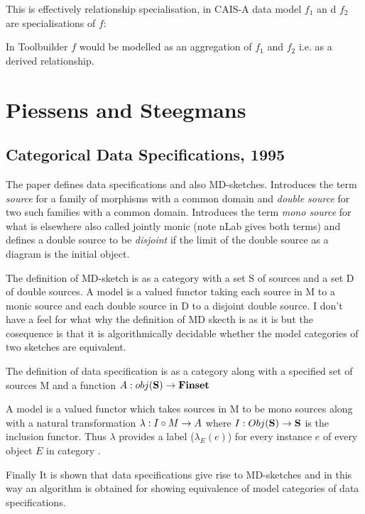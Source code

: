 \documentclass[10pt,a4paper]{scrartcl}
\renewcommand{\erpictureFolder}[0]{../SharedPictures}
\begin{document}
This is effectively relationship specialisation, in CAIS-A
 data model $f_1$ an d $f_2$ are specialisations of $f$: 

\begin{center}

\end{center}
In Toolbuilder $f$ would be modelled as an aggregation of $f_1$ and $f_2$ i.e. as 
a derived relationship.

\section {Piessens and Steegmans}
\subsection{Categorical Data Specifications, 1995}
The paper \cite{piessens1995} defines data specifications and also MD-sketches.
Introduces the term \textit{source} for a family of morphisms with a common domain and \textit{double source} for two such families with a common domain.
Introduces the term \textit{mono source} 	for what is elsewhere also called jointly monic (note nLab gives both terms) and defines a double source to be \textit{disjoint} if the limit of the double source as a diagram is the initial object.

The definition of MD-sketch is as a category with a set S of sources and a set D of double sources. A model is a  valued functor taking each source in M to a monic source and each double source in D to a disjoint double source. 
I don't have a feel for what why the definition of MD skecth is as it is but the cosequence is that it is algorithmically decidable whether the model categories of two sketches are equivalent. 

The definition of data specification is as a category  along with a specified set of sources M and a function $A: obj(\textbf{S}) \rightarrow \textbf{Finset}$

A model is a  valued functor which takes sources in M to be mono sources along with a natural transformation $\lambda : I \circ M \rightarrow A$ where $I:Obj(\textbf{S}) \rightarrow \textbf{S}$ is the inclusion functor. Thus $\lambda$ provides a label ($\lambda_E(e)$) for every instance
$e$ of every object $E$ in category .

Finally It is shown that data specifications give rise to MD-sketches and in this way an algorithm is obtained for showing equivalence of model categories of data specifications.
\end{document}
